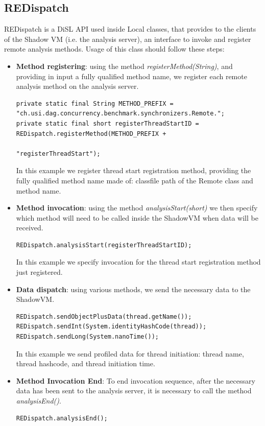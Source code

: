 \documentclass[]{usiinfthesis}
\begin{document}
\subsection{REDispatch}
REDispatch is a DiSL API used inside Local classes, that provides to the clients of the Shadow VM (i.e. the analysis server), an interface to invoke and register remote analysis methods. Usage of this class should follow these steps:
\begin{itemize}
    \item \textbf{Method registering}: using the method \textit{registerMethod(String)}, and providing in input a fully qualified method name, we register each remote analysis method on the analysis server.
    \vspace*{0.5cm}
    \begin{verbatim}
private static final String METHOD_PREFIX = "ch.usi.dag.concurrency.benchmark.synchronizers.Remote.";
private static final short registerThreadStartID = REDispatch.registerMethod(METHOD_PREFIX +
                                                                        "registerThreadStart");
\end{verbatim}
\vspace*{0.5cm}
    In this example we register thread start registration method, providing the fully qualified method name made of: classfile path of the Remote class and method name.
    \item \textbf{Method invocation}: using the method \textit{analysisStart(short)} we then specify which method will need to be called inside the ShadowVM when data will be received.
    \vspace*{0.5cm}
    \begin{verbatim}
REDispatch.analysisStart(registerThreadStartID);
\end{verbatim}
\vspace*{0.5cm}
    In this example we specify invocation for the thread start registration method just registered.
    \item \textbf{Data dispatch}: using various methods, we send the necessary data to the ShadowVM.
    \vspace*{0.5cm}
    \begin{verbatim}
REDispatch.sendObjectPlusData(thread.getName());
REDispatch.sendInt(System.identityHashCode(thread));
REDispatch.sendLong(System.nanoTime());
\end{verbatim}
\vspace*{0.5cm}
    In this example we send profiled data for thread initiation: thread name, thread hashcode, and thread initiation time. 
    \item \textbf{Method Invocation End}: To end invocation sequence, after the necessary data has been sent to the analysis server, it is necessary to call the method \textit{analysisEnd()}.
    \vspace*{0.5cm}
    \begin{verbatim}
REDispatch.analysisEnd();
\end{verbatim}
\vspace*{0.5cm}
\end{itemize}
\end{document}
